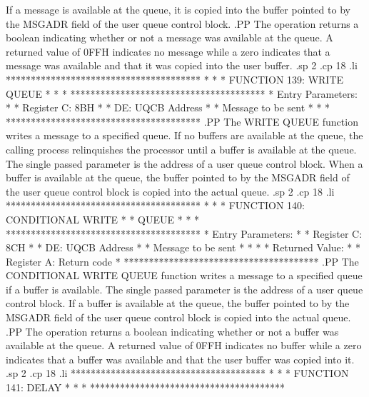 If a message is available at the queue, it is copied into the
buffer pointed to by the MSGADR field of the user queue control block.
.PP
The operation returns a boolean indicating whether or not a
message was available at the queue.  A returned value of
0FFH indicates no message while a zero indicates that a message was
available and that it was copied into the user buffer.
.sp 2
.cp 18
.li
***************************************
*                                     *
*  FUNCTION 139:  WRITE QUEUE         *
*                                     *
***************************************
*  Entry Parameters:                  *
*      Register   C:  8BH             *
*                DE:  UQCB Address    *
*      Message to be sent             *
*                                     *
***************************************
.PP
The WRITE QUEUE function writes a message to
a specified queue.  If no buffers are available at the queue, the
calling process relinquishes the processor until a buffer is available
at the queue.  The single passed parameter is the address of a user
queue control block.
When a buffer is available at the queue, the
buffer pointed to by the MSGADR field of the user queue control block
is copied into the actual queue.
.sp 2
.cp 18
.li
***************************************
*                                     *
*  FUNCTION 140:  CONDITIONAL WRITE   *
*                 QUEUE               *
*                                     *
***************************************
*  Entry Parameters:                  *
*      Register   C:  8CH             *
*                DE:  UQCB Address    *
*      Message to be sent             *
*                                     *
*  Returned   Value:                  *
*      Register   A:  Return code     *
***************************************
.PP
The CONDITIONAL WRITE QUEUE function writes
a message to a specified queue if a buffer is available.
The single passed parameter is the address of a user
queue control block.
If a buffer is available at the queue, the
buffer pointed to by the MSGADR field of the user queue control block
is copied into the actual queue.
.PP
The operation returns a boolean indicating whether or not a
buffer was available at the queue.  A returned value of
0FFH indicates no buffer while a zero indicates that a buffer was
available and that the user buffer was copied into it.
.sp 2
.cp 18
.li
***************************************
*                                     *
*  FUNCTION 141:  DELAY               *
*                                     *
***************************************

